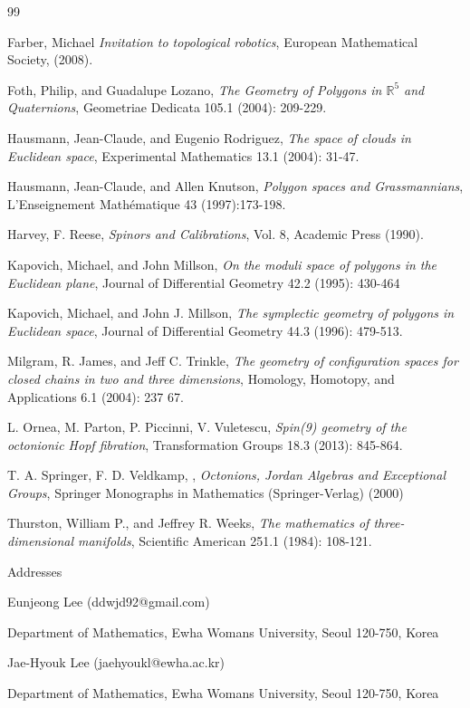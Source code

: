 \documentclass[a4paper]{article}%
\begin{document}
\begin{thebibliography}{99}                                                                                               %


Farber, Michael \emph{Invitation to topological robotics},
European Mathematical Society, (2008).

Foth, Philip, and Guadalupe Lozano, \emph{The Geometry of
Polygons in $\mathbb{R}^{5}$ and Quaternions}, Geometriae Dedicata 105.1
(2004): 209-229.

Hausmann, Jean-Claude, and Eugenio Rodriguez, \emph{The space of
clouds in Euclidean space}, Experimental Mathematics 13.1 (2004): 31-47.

Hausmann, Jean-Claude, and Allen Knutson, \emph{Polygon spaces
and Grassmannians}, L'Enseignement Math\'{e}matique 43 (1997):173-198.

Harvey, F. Reese, \emph{Spinors and Calibrations}, Vol. 8,
Academic Press (1990).

Kapovich, Michael, and John Millson, \emph{On the moduli space
of polygons in the Euclidean plane}, Journal of Differential Geometry 42.2
(1995): 430-464

Kapovich, Michael, and John J. Millson, \emph{The symplectic
geometry of polygons in Euclidean space}, Journal of Differential Geometry
44.3 (1996): 479-513.

Milgram, R. James, and Jeff C. Trinkle, \emph{The geometry of
configuration spaces for closed chains in two and three dimensions}, Homology,
Homotopy, and Applications 6.1 (2004): 237 67.

L. Ornea, M. Parton, P. Piccinni, V. Vuletescu, \emph{Spin(9)
geometry of the octonionic Hopf fibration}, Transformation Groups 18.3 (2013): 845-864.

T. A. Springer, F. D. Veldkamp, , \emph{Octonions, Jordan
Algebras and Exceptional Groups}, Springer Monographs in Mathematics
(Springer-Verlag) (2000)

Thurston, William P., and Jeffrey R. Weeks, \emph{The mathematics
of three-dimensional manifolds}, Scientific American 251.1 (1984): 108-121.
\end{thebibliography}

\bigskip

\bigskip

Addresses

Eunjeong Lee (ddwjd92@gmail.com)

Department of Mathematics, Ewha Womans University, Seoul 120-750, Korea

Jae-Hyouk Lee (jaehyoukl@ewha.ac.kr)

Department of Mathematics, Ewha Womans University, Seoul 120-750, Korea
\end{document}
